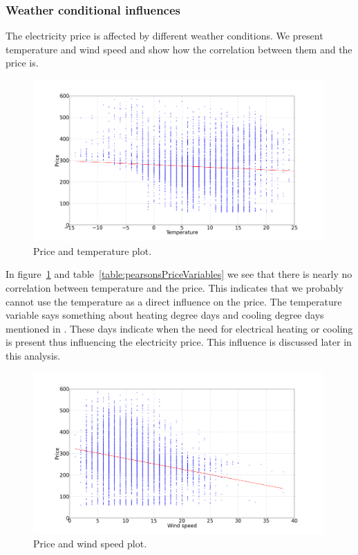 \subsubsection{Weather conditional influences}
\label{sec:priceWeatherInfluence}
The electricity price is affected by different weather conditions. We present temperature and wind speed and show how the correlation between them and the price is.

\begin{figure}[H]
\centering
\includegraphics[width=0.99\textwidth]{billeder/energy_price_plots/price_temp.png}
\caption{Price and temperature plot.}
\label{fig:price_temp}
\end{figure}

In figure~\ref{fig:price_temp} and table~\ref{table:pearsonsPriceVariables} we see that there is nearly no correlation between temperature and the price. This indicates that we probably cannot use the temperature as a direct influence on the price. The temperature variable says something about heating degree days and cooling degree days mentioned in \cite{19}. These days indicate when the need for electrical heating or cooling is present thus influencing the electricity price. This influence is discussed later in this analysis.

\begin{figure}[H]
\centering
\includegraphics[width=0.99\textwidth]{billeder/energy_price_plots/price_wind.png}
\caption{Price and wind speed plot.}
\label{fig:price_wind}
\end{figure}

